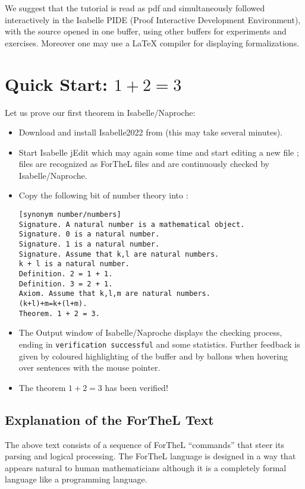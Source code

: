 \documentclass[11pt]{article}
\begin{document}
We suggest that the tutorial is read as pdf and simultaneously followed 
interactively in the Isabelle
PIDE (Proof Interactive Development Environment), with the source
 opened in one buffer, using other buffers
for experiments and exercises. Moreover one may use a \LaTeX{} compiler
for displaying  formalizations.

\section{Quick Start: $1 + 2 = 3$}

Let us prove our first theorem in Isabelle/Naproche:

\begin{itemize}
\item Download and install Isabelle2022 from
 (this may take several minutes).

\item Start Isabelle jEdit which may again some time and
start editing a new file ;  files are recognized
as ForTheL files and are continuously checked by Isabelle/Naproche.

\item Copy the following bit of number theory into :
\begin{verbatim}
[synonym number/numbers]
Signature. A natural number is a mathematical object.
Signature. 0 is a natural number.
Signature. 1 is a natural number.
Signature. Assume that k,l are natural numbers.
k + l is a natural number.
Definition. 2 = 1 + 1.
Definition. 3 = 2 + 1.
Axiom. Assume that k,l,m are natural numbers.
(k+l)+m=k+(l+m).
Theorem. 1 + 2 = 3.
\end{verbatim}

\item The Output window of Isabelle/Naproche displays the checking
process, ending in \verb+verification successful+ and
some statistics.
Further feedback is given by coloured highlighting of the buffer and by
ballons when hovering over sentences with the mouse pointer.

\item The theorem $1+2=3$ has been verified!
\end{itemize}

\subsection{Explanation of the ForTheL Text}
The above text consists of a sequence of ForTheL ``commands'' that steer its
parsing and logical processing. The ForTheL language is designed
in a way that appears natural to human mathematicians although it is a
completely formal language like a programming language.
\end{document}
